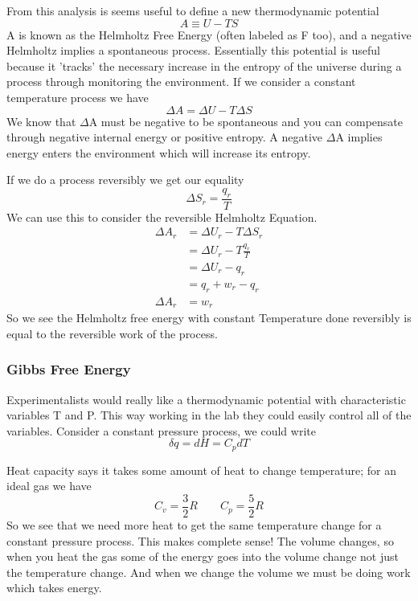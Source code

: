 \documentclass{article}
\begin{document}
From this analysis is seems useful to define a new thermodynamic potential 
\begin{equation}
A \equiv U - TS
\end{equation}
A is known as the Helmholtz Free Energy (often labeled as F too), and a negative Helmholtz implies a spontaneous process. 
Essentially this potential is useful because it 'tracks' the  necessary increase in the entropy of the universe during a process through monitoring the environment. 
If we consider a constant temperature process we have
\begin{equation}
\Delta A = \Delta U - T\Delta S
\end{equation}
We know that $\Delta$A must be negative to be spontaneous and you can compensate through negative internal energy or positive entropy. 
A negative $\Delta$A implies energy enters the environment which will increase its entropy. 

If we do a process reversibly we get our equality
\begin{equation}
    \Delta S_r = \frac{q_r}{T}
\end{equation}
We can use this to consider the reversible Helmholtz Equation. 
\begin{equation}
    \begin{split}
        \Delta A_r &= \Delta U_r - T\Delta S_r \\
        &= \Delta U_r - T\frac{q_r}{T} \\
        &= \Delta U_r - q_r \\
        &= q_r + w_r - q_r \\
        \Delta A_r &= w_r
    \end{split}
\end{equation}
So we see the Helmholtz free energy with constant Temperature done reversibly is equal to the reversible work of the process. 

\subsubsection*{Gibbs Free Energy}
Experimentalists would really like a thermodynamic potential with characteristic variables T and P. 
This way working in the lab they could easily control all of the variables. 
Consider a constant pressure process, we could write 
\begin{equation}
    \delta q = dH = C_pdT
\end{equation}

Heat capacity says it takes some amount of heat to change temperature; for an ideal gas we have
\begin{equation}
    C_v = \frac{3}{2}R \qquad C_p = \frac{5}{2}R
\end{equation}
So we see that we need more heat to get the same temperature change for a constant pressure process.
This makes complete sense!
The volume changes, so when you heat the gas some of the energy goes into the volume change not just the temperature change. 
And when we change the volume we must be doing work which takes energy. 
\end{document}
